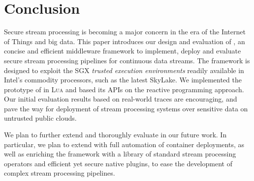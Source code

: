\section{Conclusion}
\label{sec:conclusion}

Secure stream processing is becoming a major concern in the era of the Internet of Things and big data.
This paper introduces our design and evaluation of \SYS{}, an concise and efficient middleware framework to implement, deploy and evaluate secure stream processing pipelines for continuous data streams.
The framework is designed to exploit the SGX \emph{trusted execution environments} readily available in Intel{\textregistered}'s commodity processors, such as the latest SkyLake.
We implemented the prototype of \SYS{} in \textsc{Lua} and based its APIs on the reactive programming approach.
Our initial evaluation results based on real-world traces are encouraging, and pave the way for deployment of stream processing systems over sensitive data on untrusted public clouds.

We plan to further extend and thoroughly evaluate \SYS in our future work.
In particular, we plan to extend \SYS with full automation of container deployments, as well as enriching the framework with a library of standard stream processing operators and efficient yet secure native plugins, to ease the development of complex stream processing pipelines.
